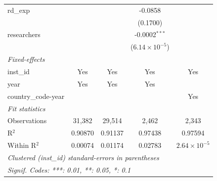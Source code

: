 \begin{tabular}{lcccc}
   rd\_exp             &                &                 & -0.0858                 &   \\   
                       &                &                 & (0.1700)                &   \\   
   researchers         &                &                 & -0.0002$^{***}$         &   \\   
                       &                &                 & ($6.14\times 10^{-5}$)  &   \\   
   \midrule
   \emph{Fixed-effects}\\
   inst\_id            & Yes            & Yes             & Yes                     & Yes\\  
   year                & Yes            & Yes             & Yes                     & \\  
   country\_code-year  &                &                 &                         & Yes\\  
   \midrule
   \emph{Fit statistics}\\
   Observations        & 31,382         & 29,514          & 2,462                   & 2,343\\  
   R$^2$               & 0.90870        & 0.91137         & 0.97438                 & 0.97594\\  
   Within R$^2$        & 0.00074        & 0.01174         & 0.02783                 & $2.64\times 10^{-5}$\\   
   \midrule \midrule
   \multicolumn{5}{l}{\emph{Clustered (inst\_id) standard-errors in parentheses}}\\
   \multicolumn{5}{l}{\emph{Signif. Codes: ***: 0.01, **: 0.05, *: 0.1}}\\
\end{tabular}
\par\endgroup


